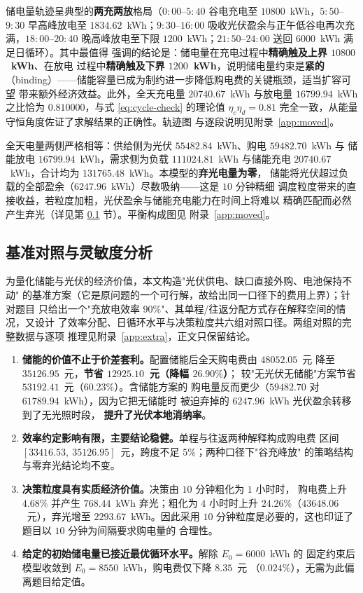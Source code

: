 \documentclass[withoutpreface,bwprint]{cumcmthesis}
\begin{document}
储电量轨迹呈典型的\textbf{两充两放}格局（$0{:}00$--$5{:}40$ 谷电充电至
$10800$~kWh，$5{:}50$--$9{:}30$ 早高峰放电至 $1834.62$~kWh；$9{:}30$--$16{:}00$
吸收光伏盈余与正午低谷电再次充满，$18{:}00$--$20{:}40$ 晚高峰放电至下限
$1200$~kWh；$21{:}50$--$24{:}00$ 送回 $6000$~kWh 满足日循环）。其中最值得
强调的结论是：储电量在充电过程中\textbf{精确触及上界 $10800$~kWh}、在放电
过程中\textbf{精确触及下界 $1200$~kWh}，说明储电量约束是\textbf{紧的}
（binding）——储能容量已成为制约进一步降低购电费的关键瓶颈，适当扩容可望
带来额外经济效益。此外，全天充电量 $20740.67$~kWh 与放电量 $16799.94$~kWh
之比恰为 $0.810000$，与式 \eqref{eq:cycle-check} 的理论值
$\eta_c\eta_d=0.81$ 完全一致，从能量守恒角度佐证了求解结果的正确性。轨迹图
与逐段说明见附录~\ref{app:moved}。

全天电量两侧严格相等：供给侧为光伏 $55482.84$~kWh、购电 $59482.70$~kWh 与
储能放电 $16799.94$~kWh，需求侧为负载 $111024.81$~kWh 与储能充电
$20740.67$~kWh，合计均为 $131765.48$~kWh。本模型的\textbf{弃光电量为零}，
储能将光伏超过负载的全部盈余（$6247.96$~kWh）尽数吸纳——这是 $10$ 分钟精细
调度粒度带来的直接收益，若粒度加粗，光伏盈余与储能充电能力在时间上将难以
精确匹配而必然产生弃光（详见第 \ref{sec:sensitivity} 节）。平衡构成图见
附录~\ref{app:moved}。


\subsection{基准对照与灵敏度分析}
\label{sec:sensitivity}

为量化储能与光伏的经济价值，本文构造"光伏供电、缺口直接外购、电池保持不动"
的基准方案（它是原问题的一个可行解，故给出同一口径下的费用上界）；针对题目
只给出一个"充放电效率 $90\%$"、其单程/往返分配方式存在解释空间的情况，又设计
了效率分配、日循环水平与决策粒度共六组对照口径。两组对照的完整数据与逐项
推理见附录~\ref{app:extra}，正文只保留结论。

\begin{enumerate}
  \item \textbf{储能的价值不止于价差套利。}配置储能后全天购电费由 $48052.05$~元
        降至 $35126.95$~元，\textbf{节省 $12925.10$~元（降幅 $26.90\%$）}；
        较"无光伏无储能"方案节省 $53192.41$~元（$60.23\%$）。含储能方案的
        购电量反而更少（$59482.70$ 对 $61789.94$~kWh），因为它把无储能时
        被迫弃掉的 $6247.96$~kWh 光伏盈余转移到了无光照时段，
        \textbf{提升了光伏本地消纳率}。
  \item \textbf{效率约定影响有限，主要结论稳健。}单程与往返两种解释构成购电费
        区间 $[33416.53,\ 35126.95]$~元，跨度不足 $5\%$；两种口径下"谷充峰放"
        的策略结构与零弃光结论均不变。
  \item \textbf{决策粒度具有实质经济价值。}决策由 $10$ 分钟粗化为 $1$ 小时时，
        购电费上升 $4.68\%$ 并产生 $768.44$~kWh 弃光；粗化为 $4$ 小时时上升
        $24.26\%$（$43648.06$~元），弃光增至 $2293.67$~kWh。因此采用
        $10$ 分钟粒度是必要的，这也印证了题目以 $10$ 分钟为间隔要求购电量的
        合理性。
  \item \textbf{给定的初始储电量已接近最优循环水平。}解除 $E_0=6000$~kWh 的
        固定约束后模型收敛到 $E_0=8550$~kWh，购电费仅下降 $8.35$~元
        （$0.024\%$），无需为此偏离题目给定值。
\end{enumerate}
\end{document}
